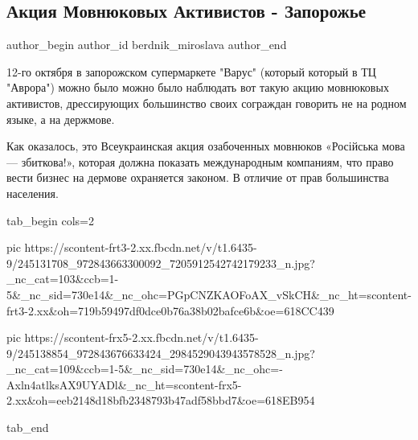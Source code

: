  
 
 
 
 
 
\subsection{Акция Мовнюковых Активистов - Запорожье}
\label{sec:13_10_2021.fb.berdnik_miroslava.1.zaporozhie_mova_akcia}
 
\ifcmt
 author_begin
   author_id berdnik_miroslava
 author_end
\fi

12-го октября в  запорожском супермаркете "Варус" (который который в ТЦ
"Аврора")  можно было можно было наблюдать вот такую акцию  мовнюковых
активистов, дрессирующих большинство своих сограждан  говорить не на родном
языке, а на держмове.

Как оказалось, это Всеукраинская акция озабоченных мовнюков  «Російська мова —
збиткова!», которая должна показать международным компаниям, что право вести
бизнес на дермове охраняется законом.   В отличие от прав большинства
населения.

\ifcmt
  tab_begin cols=2

     pic https://scontent-frt3-2.xx.fbcdn.net/v/t1.6435-9/245131708_972843663300092_7205912542742179233_n.jpg?_nc_cat=103&ccb=1-5&_nc_sid=730e14&_nc_ohc=PGpCNZKAOFoAX_vSkCH&_nc_ht=scontent-frt3-2.xx&oh=719b59497df0dce0b76a38b02bafce6b&oe=618CC439

     pic https://scontent-frx5-2.xx.fbcdn.net/v/t1.6435-9/245138854_972843676633424_2984529043943578528_n.jpg?_nc_cat=109&ccb=1-5&_nc_sid=730e14&_nc_ohc=-Axln4atlksAX9UYADl&_nc_ht=scontent-frx5-2.xx&oh=eeb2148d18bfb2348793b47adf58bbd7&oe=618EB954

  tab_end
\fi

